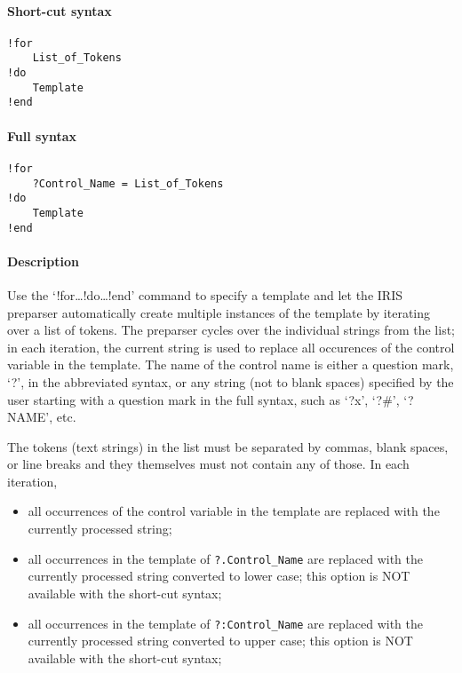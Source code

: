 


	\paragraph{Short-cut syntax}

\begin{verbatim}
!for
    List_of_Tokens
!do
    Template
!end
\end{verbatim}

\paragraph{Full syntax}

\begin{verbatim}
!for
    ?Control_Name = List_of_Tokens
!do
    Template
!end
\end{verbatim}

\paragraph{Description}

Use the `!for\ldots{}!do\ldots{}!end' command to specify a template and
let the IRIS preparser automatically create multiple instances of the
template by iterating over a list of tokens. The preparser cycles over
the individual strings from the list; in each iteration, the current
string is used to replace all occurences of the control variable in the
template. The name of the control name is either a question mark, `?',
in the abbreviated syntax, or any string (not to blank spaces) specified
by the user starting with a question mark in the full syntax, such as
`?x', `?\#', `?NAME', etc.

The tokens (text strings) in the list must be separated by commas, blank
spaces, or line breaks and they themselves must not contain any of
those. In each iteration,

\begin{itemize}
\item
  all occurrences of the control variable in the template are replaced
  with the currently processed string;
\item
  all occurrences in the template of \texttt{?.Control\_Name} are
  replaced with the currently processed string converted to lower case;
  this option is NOT available with the short-cut syntax;
\item
  all occurrences in the template of \texttt{?:Control\_Name} are
  replaced with the currently processed string converted to upper case;
  this option is NOT available with the short-cut syntax;
\end{itemize}

